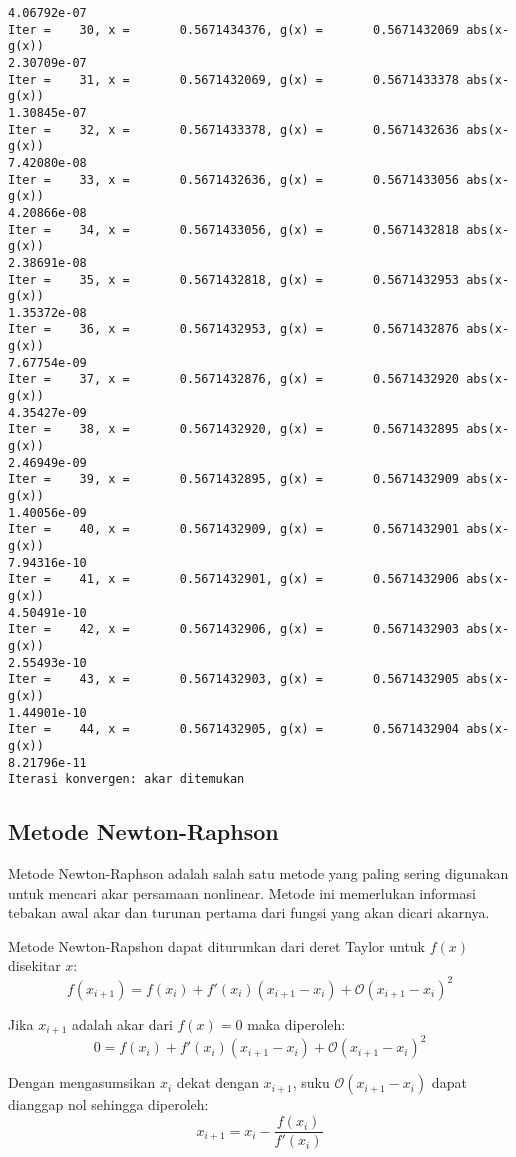 \documentclass[11pt]{article}
\begin{document}
\begin{Verbatim}[commandchars=\\\{\}]
4.06792e-07
Iter =    30, x =       0.5671434376, g(x) =       0.5671432069 abs(x-g(x))
2.30709e-07
Iter =    31, x =       0.5671432069, g(x) =       0.5671433378 abs(x-g(x))
1.30845e-07
Iter =    32, x =       0.5671433378, g(x) =       0.5671432636 abs(x-g(x))
7.42080e-08
Iter =    33, x =       0.5671432636, g(x) =       0.5671433056 abs(x-g(x))
4.20866e-08
Iter =    34, x =       0.5671433056, g(x) =       0.5671432818 abs(x-g(x))
2.38691e-08
Iter =    35, x =       0.5671432818, g(x) =       0.5671432953 abs(x-g(x))
1.35372e-08
Iter =    36, x =       0.5671432953, g(x) =       0.5671432876 abs(x-g(x))
7.67754e-09
Iter =    37, x =       0.5671432876, g(x) =       0.5671432920 abs(x-g(x))
4.35427e-09
Iter =    38, x =       0.5671432920, g(x) =       0.5671432895 abs(x-g(x))
2.46949e-09
Iter =    39, x =       0.5671432895, g(x) =       0.5671432909 abs(x-g(x))
1.40056e-09
Iter =    40, x =       0.5671432909, g(x) =       0.5671432901 abs(x-g(x))
7.94316e-10
Iter =    41, x =       0.5671432901, g(x) =       0.5671432906 abs(x-g(x))
4.50491e-10
Iter =    42, x =       0.5671432906, g(x) =       0.5671432903 abs(x-g(x))
2.55493e-10
Iter =    43, x =       0.5671432903, g(x) =       0.5671432905 abs(x-g(x))
1.44901e-10
Iter =    44, x =       0.5671432905, g(x) =       0.5671432904 abs(x-g(x))
8.21796e-11
Iterasi konvergen: akar ditemukan
    \end{Verbatim}

    \hypertarget{metode-newton-raphson}{%
\subsection{Metode Newton-Raphson}\label{metode-newton-raphson}}

    Metode Newton-Raphson adalah salah satu metode yang paling sering
digunakan untuk mencari akar persamaan nonlinear. Metode ini memerlukan
informasi tebakan awal akar dan turunan pertama dari fungsi yang akan
dicari akarnya.

Metode Newton-Rapshon dapat diturunkan dari deret Taylor untuk \(f(x)\)
disekitar \(x\): \[
f(x_{i+1}) = f(x_{i}) +
f'(x_{i})(x_{i+1} - x_{i}) +
\mathcal{O}(x_{i+1} - x_{i})^2
\]

Jika \(x_{i+1}\) adalah akar dari \(f(x)=0\) maka diperoleh: \[
0 = f(x_{i}) +
f'(x_{i})(x_{i+1} - x_{i}) +
\mathcal{O}(x_{i+1} - x_{i})^2
\]

Dengan mengasumsikan \(x_{i}\) dekat dengan \(x_{i+1}\), suku
\(\mathcal{O}(x_{i+1} - x_{i})\) dapat dianggap nol sehingga diperoleh:
\[
x_{i+1} = x_{i} - \frac{f(x_{i})}{f'(x_{i})}
\]
\end{document}
